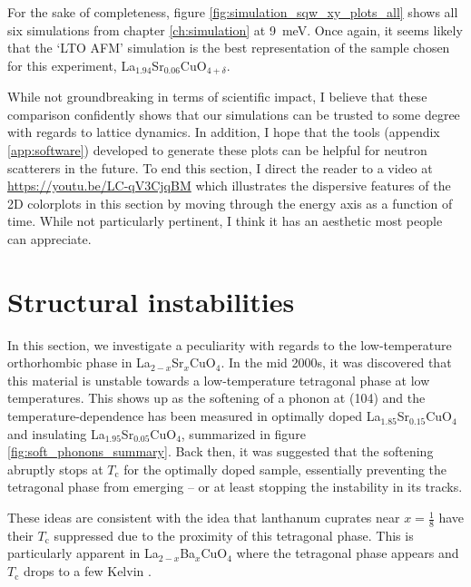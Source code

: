 For the sake of completeness, figure \ref{fig:simulation_sqw_xy_plots_all} shows all six simulations from chapter \ref{ch:simulation} at \SI{9}{\milli\eV}. Once again, it seems likely that the `LTO AFM' simulation is the best representation of the sample chosen for this experiment, La$_{1.94}$Sr$_{0.06}$CuO$_{4+\delta}$.

While not groundbreaking in terms of scientific impact, I believe that these comparison confidently shows that our simulations can be trusted to some degree with regards to lattice dynamics. In addition, I hope that the tools (appendix \ref{app:software}) developed to generate these plots can be helpful for neutron scatterers in the future. To end this section, I direct the reader to a video at \url{https://youtu.be/LC-qV3CjqBM} which illustrates the dispersive features of the 2D colorplots in this section by moving through the energy axis as a function of time. While not particularly pertinent, I think it has an aesthetic most people can appreciate.

\section{Structural instabilities}
In this section, we investigate a peculiarity with regards to the low-temperature orthorhombic phase in La$_{2-x}$Sr$_x$CuO$_{4}$. In the mid 2000s, it was discovered that this material is unstable towards a low-temperature tetragonal phase at low temperatures. This shows up as the softening of a phonon at (104) and the temperature-dependence has been measured in optimally doped La$_{1.85}$Sr$_{0.15}$CuO$_4$ and insulating La$_{1.95}$Sr$_{0.05}$CuO$_4$, summarized in figure \ref{fig:soft_phonons_summary}. Back then, it was suggested that the softening abruptly stops at $T_\text{c}$ for the optimally doped sample, essentially preventing the tetragonal phase from emerging -- or at least stopping the instability in its tracks.

These ideas are consistent with the idea that lanthanum cuprates near $x=\frac{1}{8}$ have their $T_\text{c}$ suppressed due to the proximity of this tetragonal phase. This is particularly apparent in La$_{2-x}$Ba$_x$CuO$_4$ where the tetragonal phase appears and $T_\text{c}$ drops to a few Kelvin \cite{Hucker2012}.


